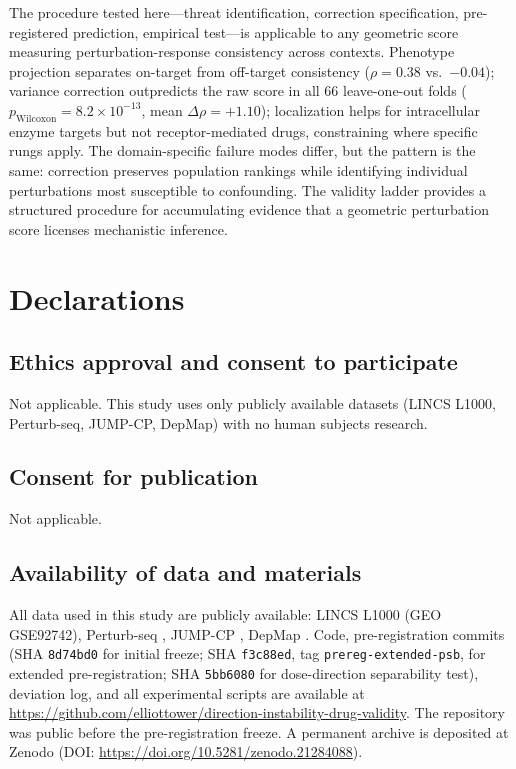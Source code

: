 \documentclass[11pt]{article}
\begin{document}
The procedure tested here---threat identification, correction
specification, pre-registered prediction, empirical test---is applicable
to any geometric score measuring perturbation-response consistency across
contexts. Phenotype projection separates on-target from off-target
consistency ($\rho = 0.38$ vs.\ $-0.04$); variance correction
outpredicts the raw score in all 66 leave-one-out folds
($p_{\text{Wilcoxon}} = 8.2 \times 10^{-13}$, mean
$\Delta\rho = +1.10$); localization helps for intracellular enzyme
targets but not receptor-mediated drugs, constraining where specific
rungs apply. The domain-specific failure modes differ, but the pattern
is the same: correction preserves population rankings while identifying
individual perturbations most susceptible to confounding. The validity
ladder provides a structured procedure for accumulating evidence that
a geometric perturbation score licenses mechanistic inference.

\section*{Declarations}

\subsection*{Ethics approval and consent to participate}
Not applicable. This study uses only publicly available datasets
(LINCS L1000, Perturb-seq, JUMP-CP, DepMap) with no human subjects
research.

\subsection*{Consent for publication}
Not applicable.

\subsection*{Availability of data and materials}
All data used in this study are publicly available: LINCS L1000
(GEO GSE92742), Perturb-seq \citep{replogle2022mapping}, JUMP-CP
\citep{chandrasekaran2023jump}, DepMap \citep{dempster2021chronos}.
Code, pre-registration commits (SHA \texttt{8d74bd0} for initial
freeze; SHA \texttt{f3c88ed}, tag \texttt{prereg-extended-psb}, for
extended pre-registration; SHA \texttt{5bb6080} for dose-direction
separability test), deviation log, and all experimental scripts are
available at
\url{https://github.com/elliottower/direction-instability-drug-validity}.
The repository was public before the pre-registration freeze.
A permanent archive is deposited at Zenodo
(DOI: \url{https://doi.org/10.5281/zenodo.21284088}).
\end{document}
